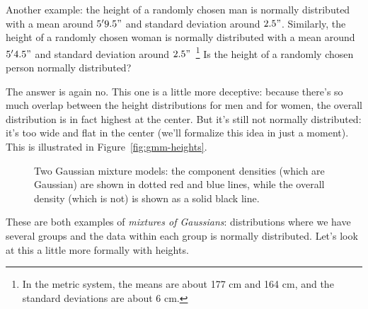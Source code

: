 \documentclass[12pt]{article}
\begin{document}
    Another example: the height of a randomly chosen man is normally
    distributed with a mean around $5'9.5"$ and standard deviation around
    $2.5"$. Similarly, the height of a randomly chosen woman is normally
    distributed with a mean around $5'4.5"$ and standard deviation around
    $2.5"$~\footnote{In the metric system, the means are about 177 cm and 164 cm,
    and the standard deviations are about 6 cm.} Is the height of a randomly
    chosen person normally distributed?

    The answer is again no. This one is a little more deceptive: because
    there's so much overlap between the height distributions for men and for
    women, the overall distribution is in fact highest at the center. But it's
    still not normally distributed: it's too wide and flat in the center (we'll
    formalize this idea in just a moment). This is illustrated in
    Figure~\ref{fig:gmm-heights}.
        \begin{figure}[t]
            \centering
            \hspace*{\fill}
            \hfill
            \caption{Two Gaussian mixture models: the component densities
                (which are Gaussian) are shown in dotted red and blue lines,
                while the overall density (which is not) is shown as a solid
                black line.}
            \hspace*{\fill}
        \end{figure}
    These are both examples of \emph{mixtures of Gaussians}: distributions
    where we have several groups and the data within each group is normally
    distributed.  Let's look at this a little more formally with heights.
\end{document}
